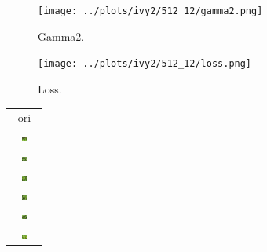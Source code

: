 \documentclass[letter]{article}
\begin{document}
\begin{figure}[h!]
	\centering
	\texttt{[image: ../plots/ivy2/512\_12/gamma2.png]}
	\caption{\label{fig:gamma1}Gamma2.}
\end{figure}

\begin{figure}[h!]
	\centering
	\texttt{[image: ../plots/ivy2/512\_12/loss.png]}
	\caption{\label{fig:gamma1}Loss.}
\end{figure}

\newpage

\begin{table}[h!]
	\centering
	\begin{tabular}{c}
		ori\tabularnewline
		\includegraphics[width=0.17\textwidth]{../data/ivy2/512/1} \tabularnewline		\includegraphics[width=0.17\textwidth]{../data/ivy2/512/2} \tabularnewline		\includegraphics[width=0.17\textwidth]{../data/ivy2/512/3} \tabularnewline		\includegraphics[width=0.17\textwidth]{../data/ivy2/512/4} \tabularnewline		\includegraphics[width=0.17\textwidth]{../data/ivy2/512/5} \tabularnewline		\includegraphics[width=0.17\textwidth]{../data/ivy2/512/6} \tabularnewline

\end{tabular}
\end{table}
\end{document}
